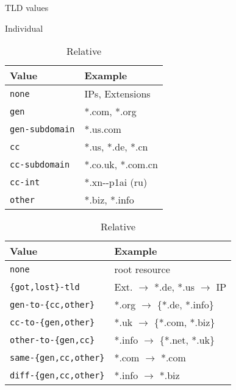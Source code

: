 \begin{table}[t]
    \centering
    \footnotesize
    \label{inclusion:tab:tld}
    \caption{TLD values}
    \begin{subtable}{.43\textwidth}
        \centering
        \caption{Individual}
        \label{inclusion:tab:tld:individual}
        \begin{tabular}{ll}
        \toprule
        \textbf{Value} & \textbf{Example} \\
        \midrule
        \texttt{none} & IPs, Extensions \\
        \texttt{gen} & *.com, *.org \\
        \texttt{gen-subdomain} & *.us.com \\
        \texttt{cc} & *.us, *.de, *.cn \\
        \texttt{cc-subdomain} & *.co.uk, *.com.cn \\
        \texttt{cc-int} & *.xn{-{}-}p1ai (ru) \\
        \texttt{other} & *.biz, *.info \\
        \bottomrule
        \end{tabular}
    \end{subtable}
    \begin{subtable}{.54\textwidth}
        \centering
        \caption{Relative}
        \label{inclusion:tab:tld:relative}
        \begin{tabular}{ll}
        \toprule
        \textbf{Value} & \textbf{Example} \\
        \midrule
        \texttt{none} & root resource \\
        \texttt{\{got,lost\}-tld} & Ext. $\rightarrow$ *.de, *.us $\rightarrow$ IP \\
        \texttt{gen-to-\{cc,other\}} & *.org $\rightarrow$ \{*.de, *.info\} \\
        \texttt{cc-to-\{gen,other\}} & *.uk $\rightarrow$ \{*.com, *.biz\} \\
        \texttt{other-to-\{gen,cc\}} & *.info $\rightarrow$ \{*.net, *.uk\} \\
        \texttt{same-\{gen,cc,other\}} & *.com $\rightarrow$ *.com \\
        \texttt{diff-\{gen,cc,other\}} & *.info $\rightarrow$ *.biz \\
        \bottomrule
        \end{tabular}
    \end{subtable} 
\end{table}
